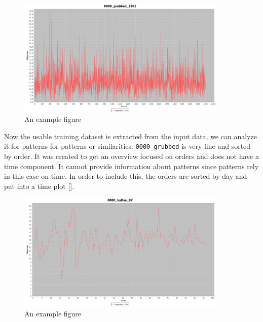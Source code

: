 \begin{figure}[h]
\begin{center}
\includegraphics[width=10cm]{images/0000_grubbed_2201.png}
\caption{An example figure}
\label{fig:example}
\end{center}
\end{figure}

Now the usable training dataset is extracted from the input data, we can analyze it for patterns for patterns or similarities.\newline
\texttt{0000\_grubbed} is very fine and sorted by order. It was created to get an overview focused on orders and does not have a time component. It cannot provide information about patterns since patterns rely in this case on time. In order to include this, the orders are sorted by day and put into a time plot [].

\begin{figure}[h]
\begin{center}
\includegraphics[width=10cm]{images/0000_byDay_97.png}
\caption{An example figure}
\label{fig:example}
\end{center}
\end{figure}


